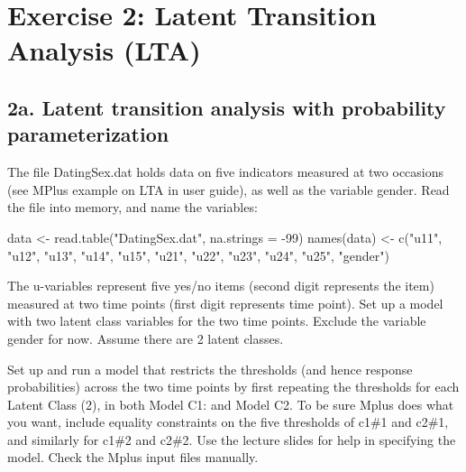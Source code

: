 \documentclass[
]{book}
\newenvironment{Shaded}{\begin{snugshade}}{\end{snugshade}}
\newcommand{\AttributeTok}[1]{\textcolor[rgb]{0.77,0.63,0.00}{#1}}
\newcommand{\DecValTok}[1]{\textcolor[rgb]{0.00,0.00,0.81}{#1}}
\newcommand{\FunctionTok}[1]{\textcolor[rgb]{0.00,0.00,0.00}{#1}}
\newcommand{\NormalTok}[1]{#1}
\newcommand{\OtherTok}[1]{\textcolor[rgb]{0.56,0.35,0.01}{#1}}
\newcommand{\SpecialCharTok}[1]{\textcolor[rgb]{0.00,0.00,0.00}{#1}}
\newcommand{\StringTok}[1]{\textcolor[rgb]{0.31,0.60,0.02}{#1}}
\begin{document}
\hypertarget{exercise-2-latent-transition-analysis-lta}{%
\section{Exercise 2: Latent Transition Analysis (LTA)}\label{exercise-2-latent-transition-analysis-lta}}

\hypertarget{a.-latent-transition-analysis-with-probability-parameterization}{%
\subsection{2a. Latent transition analysis with probability parameterization}\label{a.-latent-transition-analysis-with-probability-parameterization}}

The file DatingSex.dat holds data on five indicators measured at two occasions (see MPlus example on LTA in user guide), as well as the variable gender. Read the file into memory, and name the variables:

\begin{Shaded}
\begin{Highlighting}[]
\NormalTok{data }\OtherTok{\textless{}{-}} \FunctionTok{read.table}\NormalTok{(}\StringTok{"DatingSex.dat"}\NormalTok{, }\AttributeTok{na.strings =} \SpecialCharTok{{-}}\DecValTok{99}\NormalTok{)}
\FunctionTok{names}\NormalTok{(data) }\OtherTok{\textless{}{-}} \FunctionTok{c}\NormalTok{(}\StringTok{"u11"}\NormalTok{, }\StringTok{"u12"}\NormalTok{, }\StringTok{"u13"}\NormalTok{, }\StringTok{"u14"}\NormalTok{, }\StringTok{"u15"}\NormalTok{, }
                 \StringTok{"u21"}\NormalTok{, }\StringTok{"u22"}\NormalTok{, }\StringTok{"u23"}\NormalTok{, }\StringTok{"u24"}\NormalTok{, }\StringTok{"u25"}\NormalTok{, }
                 \StringTok{"gender"}\NormalTok{)}
\end{Highlighting}
\end{Shaded}

The u-variables represent five yes/no items (second digit represents the item) measured at two time points (first digit represents time point). Set up a model with two latent class variables for the two time points. Exclude the variable gender for now. Assume there are 2 latent classes.

Set up and run a model that restricts the thresholds (and hence response probabilities) across the two time points by first repeating the thresholds for each Latent Class (2), in both Model C1: and Model C2. To be sure Mplus does what you want, include equality constraints on the five thresholds of c1\#1 and c2\#1, and similarly for c1\#2 and c2\#2. Use the lecture slides for help in specifying the model. Check the Mplus input files manually.
\end{document}

